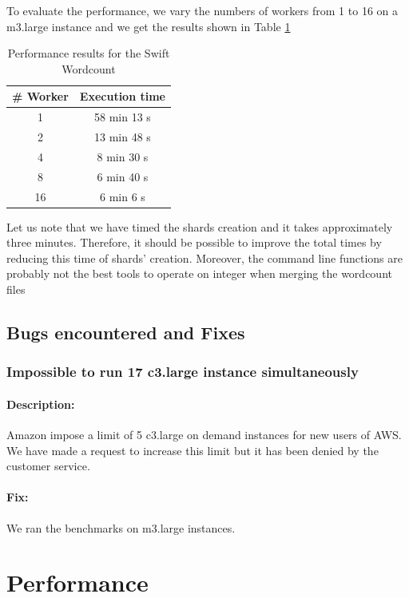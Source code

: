 \documentclass{article}
\begin{document}
To evaluate the performance, we vary the numbers of workers from 1 to 16 on a m3.large instance and we get the results shown in Table \ref{table:swift-threads-performance}

\begin{table}[h!]
  \centering
  \begin{tabular}{|c|c|}
    \hline
    \textbf{\# Worker} & \textbf{Execution time} \\
    \hline
    1 & 58 min 13 s \\
    \hline
    2 & 13 min 48 s \\
    \hline
    4 & 8 min 30 s \\
    \hline
    8 & 6 min 40 s \\
    \hline
    16 & 6 min 6 s \\
    \hline
  \end{tabular}
  \label{table:swift-threads-performance}
  \caption{Performance results for the Swift Wordcount}
\end{table}

Let us note that we have timed the shards creation and it takes approximately three minutes. Therefore, it should be possible to improve the total times by reducing this time of shards' creation.
Moreover, the command line functions are probably not the best tools to operate on integer when merging the wordcount files

\subsection{Bugs encountered and Fixes}

\subsubsection*{Impossible to run 17 c3.large instance simultaneously}
\paragraph{Description: } Amazon impose a limit of 5 c3.large on demand instances for new users of AWS. We have made a request to increase this limit but it has been denied by the customer service.
\paragraph{Fix: } We ran the benchmarks on m3.large instances.

\section{Performance}
\end{document}
